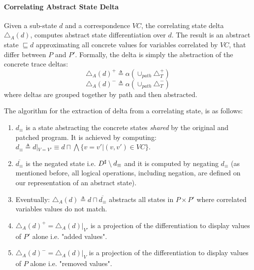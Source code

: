 \paragraph{Correlating Abstract State Delta}
\begin{definition}  
Given a sub-state $d$ and a correspondence $VC$, the correlating state delta $\triangle_{A}(d)$, computes abstract state differentiation over $d$. The result is an abstract state $\sqsubseteq d$ approximating all concrete values for variables correlated by $VC$, that differ between $P$ and $P'$. Formally, the delta is simply the abstraction of the concrete trace deltas:
\[
\triangle_{A}(d)^{+} \triangleq \alpha(\cup_{path}\triangle_{T}^{+})
\]
\[
\triangle_{A}(d)^{-} \triangleq \alpha(\cup_{path}\triangle_{T}^{-})
\]
where deltas are grouped together by path and then abstracted.
\end{definition}
The algorithm for the extraction of delta from a correlating state, is as follows:
\begin{enumerate}
\item $d_{\equiv}$ is a state abstracting the concrete states \emph{shared} by the original and patched program. It is achieved by computing: $d_{\equiv} \triangleq d|_{V=V'} \equiv d \sqcap \bigwedge\{ v = v' | (v,v') \in VC \}$.
\item $\overline{d_{\equiv}}$ is the negated state i.e. $D^\sharp \setminus d_{\equiv}$ and it is computed by negating $d_{\equiv}$ (as mentioned before, all logical operations, including negation, are defined on our representation of an abstract state).
\item Eventually: $\triangle_{A}(d) \triangleq d \sqcap \overline{d_{\equiv}}$ abstracts all states in $P \times P'$ where correlated variables values do not match.
\item $\triangle_{A}(d)^{+} = \triangle_{A}(d)|_{V'}$ is a projection of the differentiation to display values of $P'$ alone i.e. "added values".
\item $\triangle_{A}(d)^{-} = \triangle_{A}(d)|_{V}$ is a projection of the differentiation to display values of $P$ alone i.e. "removed values".
\end{enumerate}
